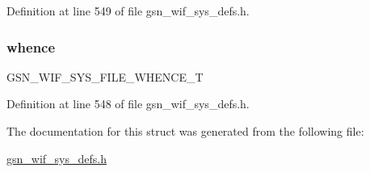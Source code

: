 Definition at line 549 of file gsn\_\-wif\_\-sys\_\-defs.h.

\hypertarget{a00350_af59d0bebb48b89bbf9945d9c478c1949}{
\subsubsection[{whence}]{ {\bf whence}}}
\label{a00350_af59d0bebb48b89bbf9945d9c478c1949}
GSN\_\-WIF\_\-SYS\_\-FILE\_\-WHENCE\_\-T 

Definition at line 548 of file gsn\_\-wif\_\-sys\_\-defs.h.



The documentation for this struct was generated from the following file:\begin{DoxyCompactItemize}
\item 
\hyperlink{a00612}{gsn\_\-wif\_\-sys\_\-defs.h}\end{DoxyCompactItemize}

